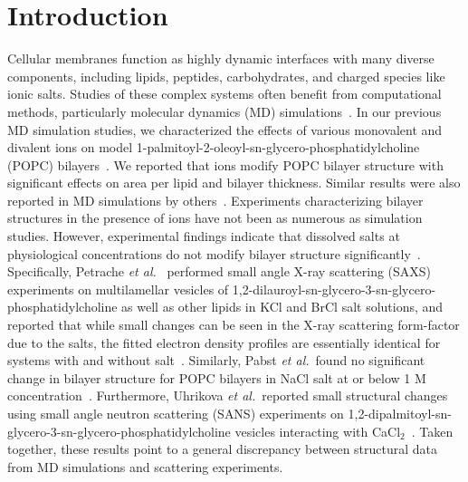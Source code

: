 \documentclass[12pt,openany,final]{book}
\newcommand{\etal}{\textit{et al.}}
\begin{document}
\section{Introduction}

Cellular membranes function as highly dynamic interfaces with many diverse components, 
including lipids, peptides, carbohydrates, and charged species like ionic salts.
Studies of these complex systems often benefit from computational methods, 
particularly molecular dynamics (MD) simulations~\cite{berkowitz:2019}. 
In our previous MD simulation studies, we characterized the effects of various 
monovalent and divalent ions on model 1-palmitoyl-2-oleoyl-sn-glycero-phosphatidylcholine (POPC) 
bilayers~\cite{pandit:2008:simulationtextbook,kruczek:2017,kruczek:2019,saunders:2019}. 
We reported that ions modify POPC bilayer structure with significant
effects on area per lipid and bilayer thickness. Similar results were also reported in MD simulations by
others~\cite{Bockmann:2003,cordomi:2008,gurtovenko:2008,Cordomi:2009,jurkiewicz:2012}.
Experiments characterizing bilayer structures in the presence of ions
have not been as numerous as simulation studies. However, experimental findings indicate that 
dissolved salts at physiological concentrations do not modify bilayer structure
significantly~\cite{pabst:2007,petrache:2006:swelling,uhrikova:2008}.
Specifically, Petrache \etal~ performed small angle X-ray scattering (SAXS) experiments on
multilamellar vesicles of 1,2-dilauroyl-sn-glycero-3-sn-glycero-phosphatidylcholine 
as well as other lipids in KCl and BrCl salt solutions, 
and reported that while small changes can be seen in the
X-ray scattering form-factor due to the 
salts, 
the fitted electron density profiles are essentially identical for
systems with and without 
salt~\cite{petrache:2006:swelling}. 
Similarly, Pabst \etal~found no significant change in bilayer structure 
for POPC bilayers in NaCl salt at or below 1 M concentration~\cite{pabst:2007}.
Furthermore, Uhrikova \etal~reported small structural changes using small angle neutron scattering
(SANS) experiments on 1,2-dipalmitoyl-sn-glycero-3-sn-glycero-phosphatidylcholine 
vesicles interacting with CaCl$_{2}$~\cite{uhrikova:2008}. 
Taken together, these results point to a general discrepancy between structural data 
from MD simulations and scattering experiments.
\end{document}
